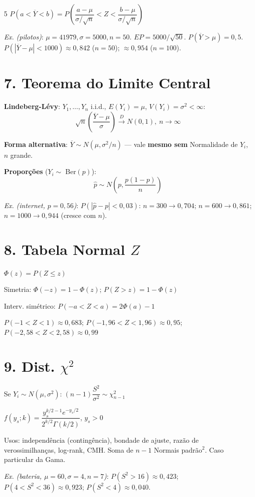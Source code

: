 \documentclass[7pt,landscape,a4paper]{extarticle}
\begin{document}
\begin{multicols*}{5}
$P(a<\overline{Y}<b)=P\!\left(\dfrac{a-\mu}{\sigma/\sqrt n}<Z<\dfrac{b-\mu}{\sigma/\sqrt n}\right)$

\textit{Ex. (pilotos)}: $\mu{=}41979,\sigma{=}5000,n{=}50$. $EP=5000/\sqrt{50}$. $P(\overline Y>\mu)=0{,}5$. $P(|\overline Y-\mu|<1000)\approx 0{,}842$ ($n{=}50$); $\approx 0{,}954$ ($n{=}100$).

\section{7. Teorema do Limite Central}
\textbf{Lindeberg-Lévy}: $Y_1,\dots,Y_n$ i.i.d., $E(Y_i)=\mu$, $V(Y_i)=\sigma^2<\infty$:
$$\sqrt n\!\left(\frac{\overline{Y}-\mu}{\sigma}\right)\xrightarrow{D} N(0,1),\ n\to\infty$$

\textbf{Forma alternativa}: $\overline{Y}\sim N(\mu,\sigma^2/n)$ — vale \textbf{mesmo sem} Normalidade de $Y_i$, $n$ grande.

\textbf{Proporções} ($Y_i\sim$ Ber$(p)$):
$$\hat p\sim N\!\left(p,\frac{p(1-p)}{n}\right)$$

\textit{Ex. (internet, $p{=}0{,}56$)}: $P(|\hat p-p|<0{,}03)$: $n{=}300\to0{,}704$; $n{=}600\to0{,}861$; $n{=}1000\to0{,}944$ (cresce com $n$).

\section{8. Tabela Normal $Z$}
$\Phi(z)=P(Z\le z)$

Simetria: $\Phi(-z)=1-\Phi(z)$; $P(Z>z)=1-\Phi(z)$

Interv. simétrico: $P(-a<Z<a)=2\Phi(a)-1$

$P(-1{<}Z{<}1)\approx0{,}683$; $P(-1{,}96{<}Z{<}1{,}96)\approx0{,}95$; $P(-2{,}58{<}Z{<}2{,}58)\approx0{,}99$

\columnbreak

\section{9. Dist. $\chi^2$}
Se $Y_i\sim N(\mu,\sigma^2)$: $(n-1)\dfrac{S^2}{\sigma^2}\sim\chi^2_{n-1}$

$f(y_s;k)=\dfrac{y_s^{k/2-1}e^{-y_s/2}}{2^{k/2}\Gamma(k/2)}$, $y_s>0$

Usos: independência (contingência), bondade de ajuste, razão de verossimilhanças, log-rank, CMH. Soma de $n{-}1$ Normais padrão$^2$. Caso particular da Gama.

\textit{Ex. (bateria, $\mu{=}60,\sigma{=}4,n{=}7$)}: $P(S^2{>}16)\approx0{,}423$; $P(4{<}S^2{<}36)\approx0{,}923$; $P(S^2{<}4)\approx0{,}040$.


\end{multicols*}
\end{document}
